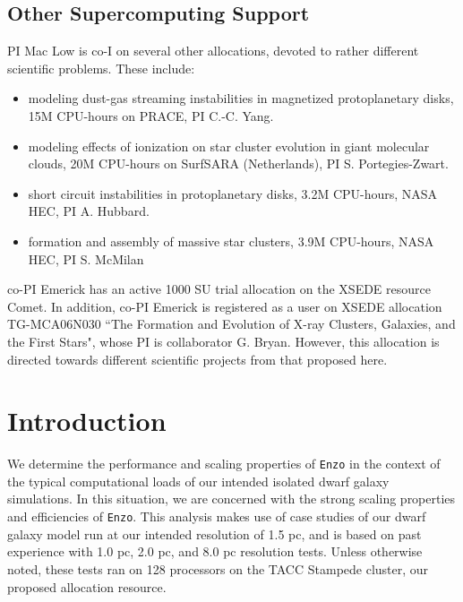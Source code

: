 \documentclass[11pt]{article}
\begin{document}

\subsection{Other Supercomputing Support}
 
PI Mac Low is co-I on several other allocations, devoted to rather different scientific problems.  These include:
\begin{itemize}
\item modeling dust-gas streaming instabilities in magnetized protoplanetary disks, 15M CPU-hours on PRACE, PI C.-C. Yang.
\item modeling effects of ionization on star cluster evolution in giant molecular clouds, 20M CPU-hours on SurfSARA (Netherlands), PI S. Portegies-Zwart.
\item short circuit instabilities in protoplanetary disks, 3.2M CPU-hours, NASA HEC, PI A. Hubbard.
\item formation and assembly of massive star clusters, 3.9M CPU-hours, NASA HEC, PI S. McMilan
\end{itemize}

co-PI Emerick has an active 1000 SU trial allocation on the XSEDE resource Comet. In addition, co-PI Emerick is registered as a user on XSEDE allocation TG-MCA06N030 ``The Formation and Evolution of X-ray Clusters, Galaxies, and the First Stars", whose PI is collaborator G. Bryan. However, this allocation is directed towards different scientific projects from that proposed here.
\clearpage
\appendix

\section{Introduction}

We determine the performance and scaling properties of \texttt{Enzo} in the context of the typical computational loads of our intended isolated dwarf galaxy simulations. In this situation, we are concerned with the strong scaling properties and efficiencies of \texttt{Enzo}. This analysis makes use of case studies of our dwarf galaxy model run at our intended resolution of 1.5 pc, and is based on past experience with 1.0 pc, 2.0 pc, and 8.0 pc resolution tests. Unless otherwise noted, these tests ran on 128 processors on the TACC Stampede cluster, our proposed allocation resource.
\end{document}
